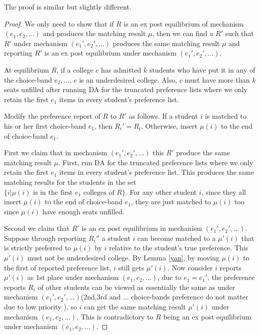 The proof is similar but slightly different.
\begin{proof}
  We only need to show that if $R$ is an ex post equilibrium of mechanism $(e_1,e_2,...)$ and produces the matching result $\mu$, then we can find a $R'$ such that $R'$ under mechanism $(e_1',e_2',...)$ produces the same matching result $\mu$ and reporting $R'$ is an ex post equilibrium under mechanism $(e_1',e_2',...)$.

  At equilibrium $R$, if a college $c$ has admitted $k$ students who have put it in any of the choice-band $e_2,...$, $c$ is an underdesired college. Also, $c$ must have more than $k$ seats unfilled after running  DA for the truncated preference lists where we only retain the first $e_1$ items in every student's preference list.

  Modify the preference report of $R$ to $R'$ as follows. If a student $i$ is matched to his or her first choice-band $e_1$, then $R_i'=R_i$. Otherwise, insert $\mu(i)$ to the end of choice-band $e_1$.

  First we claim that in mechanism $(e_1',e_2',...)$ this $R'$ produce the same matching result $\mu$. First, run  DA for the truncated preference lists where we only retain the first $e_1$ items in every student's preference list. This produces the same matching results for the students in the set $\{i| \mu(i) \text{ is in the first } e_1 \text{ colleges of } R\}$.  For any other student $i$, since they all insert $\mu(i)$ to the end of choice-band $e_1$, they are just matched to $\mu(i)$ too since $\mu(i)$ have enough seats unfilled.

  Second we claim that $R'$ is an ex post equilibrium in mechanism $(e_1',e_2',...)$.  Suppose through reporting $R_i''$ a student $i$ can become matched to a $\mu'(i)$ that is strictly preferred to $\mu(i)$ by $i$ relative to the student's true preference.  This $\mu'(i)$ must not be underdesired college. By Lemma \ref{yan}, by moving $\mu(i)$ to the first of reported preference list, $i$ still gets $\mu'(i)$. Now consider $i$ reports $\mu'(i)$ as 1st place under mechanism $(e_1,e_2,...)$, due to $e_1=e_1'$, the preference reports $R_i$ of other students can be viewed as essentially the same as under mechanism $(e_1',e_2',...)$(2nd,3rd and ...  choice-bands preference do not matter due to low priority ), so $i$ can get the same matching result  $\mu'(i)$ under mechanism $(e_1,e_2,...)$. This is contradictory to $R$ being an ex post equilibrium under mechanism $(e_1,e_2,...)$.
\end{proof}


